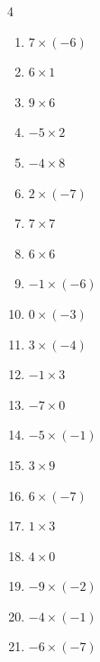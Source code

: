 \begin{multicols}{4}
\begin{enumerate}
  \item $7\times (-6)$
        \phantom{$=-42$}

  \item $6\times 1$
        \phantom{$=6$}

  \item $9\times 6$
        \phantom{$=54$}

  \item $-5\times 2$
        \phantom{$=-10$}

  \item $-4\times 8$
        \phantom{$=-32$}

  \item $2\times (-7)$
        \phantom{$=-14$}

  \item $7\times 7$
        \phantom{$=49$}

  \item $6\times 6$
        \phantom{$=36$}

  \item $-1\times (-6)$
        \phantom{$=6$}

  \item $0\times (-3)$
        \phantom{$=0$}

  \item $3\times (-4)$
        \phantom{$=-12$}

  \item $-1\times 3$
        \phantom{$=-3$}

  \item $-7\times 0$
        \phantom{$=0$}

  \item $-5\times (-1)$
        \phantom{$=5$}

  \item $3\times 9$
        \phantom{$=27$}

  \item $6\times (-7)$
        \phantom{$=-42$}

  \item $1\times 3$
        \phantom{$=3$}

  \item $4\times 0$
        \phantom{$=0$}

  \item $-9\times (-2)$
        \phantom{$=18$}

  \item $-4\times (-1)$
        \phantom{$=4$}

  \item $-6\times (-7)$
        \phantom{$=42$}


\end{enumerate}
\end{multicols}
